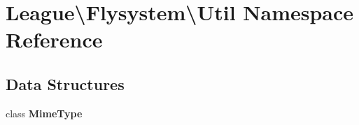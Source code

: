 \section{League\textbackslash{}Flysystem\textbackslash{}Util Namespace Reference}
\label{namespace_league_1_1_flysystem_1_1_util}
\subsection*{Data Structures}
\begin{DoxyCompactItemize}
\item 
class {\bf Mime\+Type}
\end{DoxyCompactItemize}
